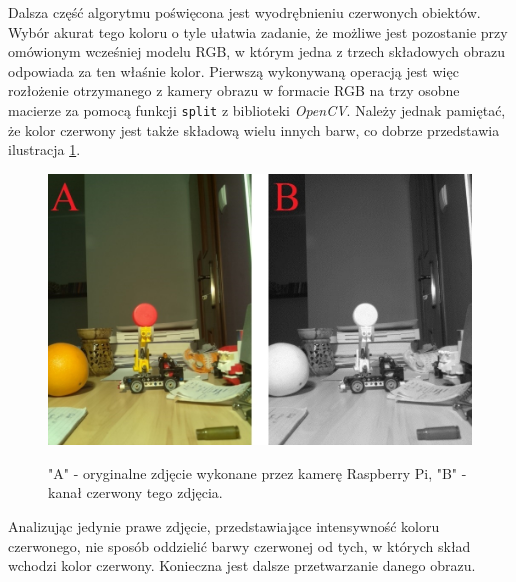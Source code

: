Dalsza część algorytmu poświęcona jest wyodrębnieniu czerwonych obiektów. Wybór akurat tego koloru o tyle ułatwia zadanie, że możliwe jest pozostanie przy omówionym wcześniej modelu RGB, w którym jedna z trzech składowych obrazu odpowiada za ten właśnie kolor. Pierwszą wykonywaną operacją jest więc rozłożenie otrzymanego z kamery obrazu w formacie RGB na trzy osobne macierze za pomocą funkcji \texttt{split} z biblioteki \textit{OpenCV}. Należy jednak pamiętać, że kolor czerwony jest także składową wielu innych barw, co dobrze przedstawia ilustracja \ref{red}.
\begin{figure}[H]
\begin{center}
\includegraphics[scale=0.42]{imgs/imgBase+Red.jpg}
\caption[Uzyskany kanał czerwony wraz z oryginalny obrazem.]\small{"A" - oryginalne zdjęcie wykonane przez kamerę Raspberry Pi, "B" - kanał czerwony tego zdjęcia.}
\label{red}
\end{center}
\end{figure}
Analizując jedynie prawe zdjęcie, przedstawiające intensywność koloru czerwonego, nie sposób oddzielić barwy czerwonej od tych, w których skład wchodzi kolor czerwony. Konieczna jest dalsze przetwarzanie danego obrazu.

